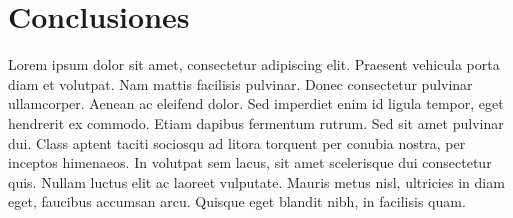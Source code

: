 \documentclass[letterpaper, 12pt, spanish]{article}
\begin{document}
\section{Conclusiones}
Lorem ipsum dolor sit amet, consectetur adipiscing elit. Praesent vehicula porta diam et volutpat. Nam mattis facilisis pulvinar. Donec consectetur pulvinar ullamcorper. Aenean ac eleifend dolor. Sed imperdiet enim id ligula tempor, eget hendrerit ex commodo. Etiam dapibus fermentum rutrum. Sed sit amet pulvinar dui. Class aptent taciti sociosqu ad litora torquent per conubia nostra, per inceptos himenaeos. In volutpat sem lacus, sit amet scelerisque dui consectetur quis. Nullam luctus elit ac laoreet vulputate. Mauris metus nisl, ultricies in diam eget, faucibus accumsan arcu. Quisque eget blandit nibh, in facilisis quam.




\setlength{\parindent}{-0.2in}
\setlength{\leftskip}{0.2in}
\setlength{\parskip}{8pt}
\vspace*{-0.2in}
\noindent

\end{document}
